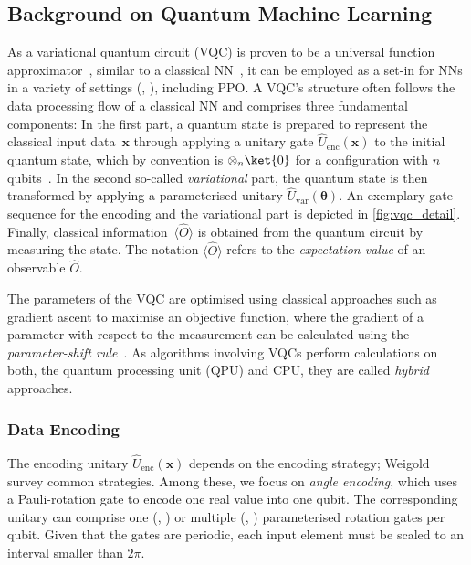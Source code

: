 \documentclass[10pt, conference]{IEEEtran}
\begin{document}
\subsection{Background on Quantum Machine Learning}
\label{sec:bg-qrl}
As a variational quantum circuit (VQC) is proven to be a universal function approximator~\cite{perez20}, similar to a classical NN~\cite{hornik89}, it can be employed as a set-in for NNs in a variety of settings (\eg, \cite{farhi14, mitarai18}), including PPO.
A VQC's structure often follows the data processing flow of a classical NN and comprises three fundamental components:
In the first part, a quantum state is prepared to represent the classical input data~$\boldsymbol{x}$ through applying a unitary gate $\hat{U}_{\text{enc}}(\boldsymbol{x})$ to the initial quantum state, which by convention is $\otimes_n \ket{0}$ for a configuration with $n$ qubits~\cite{nielsen10}.
In the second so-called \emph{variational} part, the quantum state is then transformed by applying a parameterised unitary $\hat{U}_{\text{var}}(\boldsymbol{\theta})$.
An exemplary gate sequence for the encoding and the variational part is depicted in \autoref{fig:vqc_detail}.
Finally, classical information~$\langle \hat{O} \rangle$ is obtained from the quantum circuit by measuring the state.
The notation $\langle \hat{O} \rangle$ refers to the \emph{expectation value} of an observable $\hat{O}$.

The parameters of the VQC are optimised using classical approaches such as
gradient ascent to maximise an objective function, where the gradient of a parameter with respect to the measurement can be calculated using the \emph{parameter-shift rule}~\cite{mitarai18, schuld18}.
As algorithms involving VQCs perform calculations on both, the quantum processing unit (QPU) and CPU, they are called 
\emph{hybrid} approaches.

\subsubsection{Data Encoding}
\label{subsec:enc}
The encoding unitary $\hat{U}_{\text{enc}}(\boldsymbol{x})$ depends on the encoding strategy; Weigold~\etal~\cite{weigold20, weigold21} survey common strategies.
Among these, we focus on \emph{angle encoding}, which uses a Pauli-rotation gate to encode one real value into one qubit.
The corresponding unitary can comprise one (\eg, \cite{skolik22}) or multiple (\eg, \cite{chen20}) parameterised rotation gates per qubit.
Given that the gates are periodic, each input element must be scaled to an interval smaller than $2\pi$.
\end{document}
